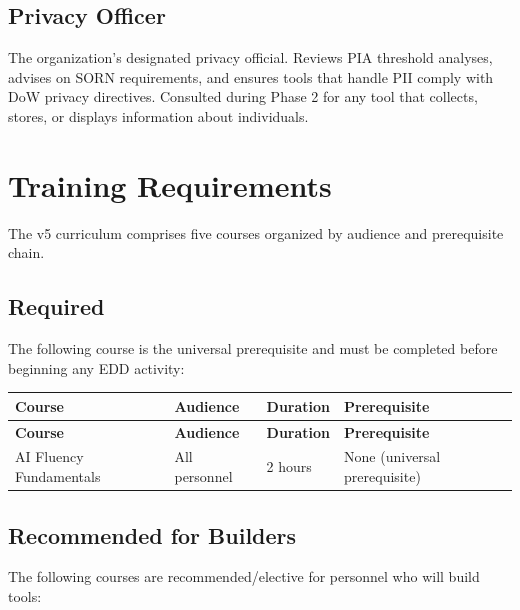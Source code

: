 \documentclass[11pt,letterpaper]{article}
\begin{document}
\subsection{Privacy Officer}
\label{sec:role-privacy}

The organization's designated privacy official. Reviews PIA threshold analyses,
advises on SORN requirements, and ensures tools that handle PII comply with DoW
privacy directives. Consulted during Phase 2 for any tool that collects, stores,
or displays information about individuals.

\section{Training Requirements}
\label{sec:training-requirements}

The v5 curriculum comprises five courses organized by audience and prerequisite chain.

\subsection{Required}
\label{sec:training-required}

The following course is the universal prerequisite and must be completed before beginning any EDD activity:

\begin{longtable}{@{}p{4cm}p{3cm}p{2cm}p{4.5cm}@{}}
\toprule
\textbf{Course} & \textbf{Audience} & \textbf{Duration} & \textbf{Prerequisite} \\
\midrule
\endfirsthead
\toprule
\textbf{Course} & \textbf{Audience} & \textbf{Duration} & \textbf{Prerequisite} \\
\midrule
\endhead
\bottomrule
\endlastfoot
AI Fluency Fundamentals & All personnel & 2 hours & None (universal prerequisite) \\
\end{longtable}

\subsection{Recommended for Builders}
\label{sec:training-recommended}

The following courses are recommended/elective for personnel who will build tools:
\end{document}
